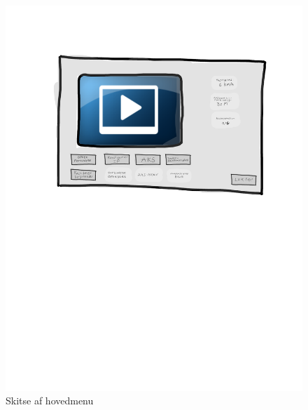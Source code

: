 \begin{figure}[h]
\centering
\includegraphics[width=\textwidth*2/3]{../fig/gui/hovedmenu}
\caption{Skitse af hovedmenu}
\label{fig:main_menu}
\end{figure}
